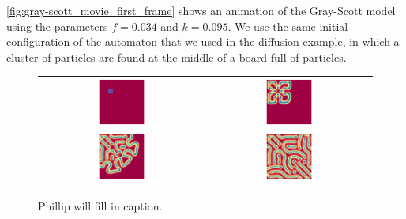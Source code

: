 \autoref{fig:gray-scott_movie_first_frame} shows an animation of the Gray-Scott model using the parameters  $f = 0.034$ and $k = 0.095$. We use the same initial configuration of the automaton that we used in the diffusion example, in which a cluster of  particles are found at the middle of a board full of  particles.\\

\begin{figure}[h]
\centering
\mySfFamily
\begin{tabular}{c c}
\includegraphics[width = 0.3\textwidth]{../images/gs_f038_k100_Moment_1.png} & \includegraphics[width = 0.3\textwidth]{../images/gs_f038_k100_Moment_2.png} \\[2ex]
\includegraphics[width = 0.3\textwidth]{../images/gs_f038_k100_Moment_3.png} & \includegraphics[width = 0.3\textwidth]{../images/gs_f038_k100_Moment_4.png}
\end{tabular}
\caption{Phillip will fill in caption.}
\label{fig:gray-scott_movie_first_frame}
\end{figure}

